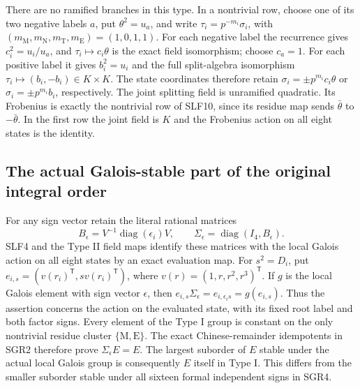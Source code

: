 There are no ramified branches in this type. In a nontrivial row,
choose one of its two negative labels $a$, put $\theta^2=u_a$, and
write $\tau_i=p^{-m_i}\sigma_i$, with
$(m_{\mathrm M},m_{\mathrm N},m_{\mathrm T},m_{\mathrm E})=(1,0,1,1)$.
For each negative label the recurrence gives
$c_i^2=u_i/u_a$, and $\tau_i\mapsto c_i\theta$ is the exact
field isomorphism; choose $c_a=1$. For each positive label it gives
$b_i^2=u_i$ and the full split-algebra isomorphism
$\tau_i\mapsto(b_i,-b_i)\in K\times K$.
The state coordinates therefore retain
$\sigma_i=\pm p^{m_i}c_i\theta$ or
$\sigma_i=\pm p^{m_i}b_i$, respectively. The joint splitting field
is unramified quadratic. Its Frobenius is exactly the nontrivial
row of SLF10, since its residue map sends $\bar\theta$ to
$-\bar\theta$. In the first row the joint field is $K$ and the
Frobenius action on all eight states is the identity.

\subsection{The actual Galois-stable part of the original integral order}
For any sign vector retain the literal rational matrices
\[
 B_\epsilon=V^{-1}\operatorname{diag}(\epsilon_i)V,
 \qquad\Sigma_\epsilon=\operatorname{diag}(I_4,B_\epsilon).
                                                               \tag{SLF11}
\]
SLF4 and the Type II field maps identify these matrices with the
local Galois action on all eight states by an exact evaluation map.
For $s^2=D_i$, put
$e_{i,s}=(v(r_i)^{\mathsf T},s v(r_i)^{\mathsf T})$, where
$v(r)=(1,r,r^2,r^3)^{\mathsf T}$. If $g$ is the local Galois
element with sign vector $\epsilon$, then
$e_{i,s}\Sigma_\epsilon=e_{i,\epsilon_i s}=g(e_{i,s})$.
Thus the assertion concerns the action on the evaluated state,
with its fixed root label and both factor signs. Every element of the Type I group is
constant on the only nontrivial residue cluster $\{\mathrm M,\mathrm E\}$.
The exact Chinese-remainder idempotents in SGR2 therefore prove
$\Sigma_\epsilon E=E$. The largest suborder of $E$ stable under
the actual local Galois group is consequently $E$ itself in Type I.
This differs from the smaller suborder stable under all sixteen
formal independent signs in SGR4.

